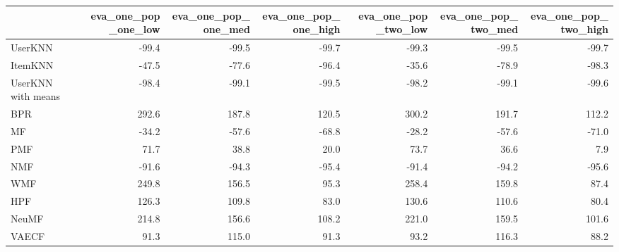 \begin{tabular}{lrrrrrr}
\toprule
{} &  eva\_one\_pop\_one\_low &  eva\_one\_pop\_one\_med &  eva\_one\_pop\_one\_high &  eva\_one\_pop\_two\_low &  eva\_one\_pop\_two\_med &  eva\_one\_pop\_two\_high \\
\midrule
UserKNN            &                -99.4 &                -99.5 &                 -99.7 &                -99.3 &                -99.5 &                 -99.7 \\
ItemKNN            &                -47.5 &                -77.6 &                 -96.4 &                -35.6 &                -78.9 &                 -98.3 \\
UserKNN with means &                -98.4 &                -99.1 &                 -99.5 &                -98.2 &                -99.1 &                 -99.6 \\
BPR                &                292.6 &                187.8 &                 120.5 &                300.2 &                191.7 &                 112.2 \\
MF                 &                -34.2 &                -57.6 &                 -68.8 &                -28.2 &                -57.6 &                 -71.0 \\
PMF                &                 71.7 &                 38.8 &                  20.0 &                 73.7 &                 36.6 &                   7.9 \\
NMF                &                -91.6 &                -94.3 &                 -95.4 &                -91.4 &                -94.2 &                 -95.6 \\
WMF                &                249.8 &                156.5 &                  95.3 &                258.4 &                159.8 &                  87.4 \\
HPF                &                126.3 &                109.8 &                  83.0 &                130.6 &                110.6 &                  80.4 \\
NeuMF              &                214.8 &                156.6 &                 108.2 &                221.0 &                159.5 &                 101.6 \\
VAECF              &                 91.3 &                115.0 &                  91.3 &                 93.2 &                116.3 &                  88.2 \\
\bottomrule
\end{tabular}
